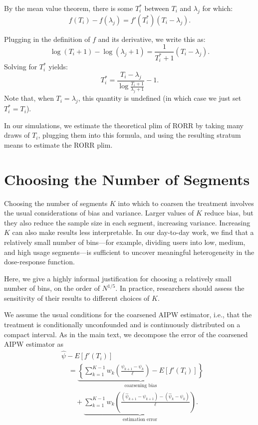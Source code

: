\documentclass[11pt]{article}
\begin{document}
By the mean value theorem, there is some $T_i^*$ between $T_i$ and $\lambda_j$ for which:
\begin{equation}
    f(T_i) - f(\lambda_j) = f'(T_i^*) (T_i - \lambda_j).
\end{equation}

Plugging in the definition of $f$ and its derivative, we write this as:
\begin{equation}
    \log(T_i + 1) - \log(\lambda_j + 1) = \frac{1}{T_i^* + 1} (T_i - \lambda_j).
\end{equation}
Solving for $T_i^*$ yields:
\begin{equation}
    T_i^* = \frac{T_i - \lambda_j}{\log \frac{T_i + 1}{\lambda_j + 1}} - 1.
\end{equation}
Note that, when $T_i = \lambda_j$, this quantity is undefined (in which case we just set $T_i^* = T_i$).

In our simulations, we estimate the theoretical plim of RORR by taking many draws of $T_i$, plugging them into this formula, and using the resulting stratum means to estimate the RORR plim.

\section{Choosing the Number of Segments}

\label{app:guidance}

Choosing the number of segments $K$ into which to coarsen the treatment involves
the usual considerations of bias and variance. Larger values of $K$ reduce bias, but they also reduce the sample size in each segment, increasing variance.  Increasing $K$ can also make results less interpretable.  In our day-to-day work, we find that a relatively small number of bins---for example, dividing users into low, medium, and high usage segments---is sufficient to uncover meaningful heterogeneity in the dose-response function. 

Here, we give a highly informal justification for choosing a relatively small number of bins, on the order of $N^{1/5}$.  In practice, researchers should assess the sensitivity of their results to different choices of $K$.

We assume the usual conditions for the coarsened AIPW estimator, i.e., that the treatment is conditionally unconfounded and is continuously distributed on a compact interval.  As in the main text, we decompose the error of the coarsened AIPW estimator as
\begin{align}
\nonumber 
& \widehat{\psi} - E[f'(T_i)] \\
& \quad =
\underbrace{\left\{
\sum_{k=1}^{K-1}
w_k
\left(
\frac{\psi_{k+1}-\psi_k}{\ell}
\right)
-E[f'(T_i)]
\right\}}_{\text{coarsening bias}} \nonumber
\\
& \qquad +
\underbrace{
\sum_{k=1}^{K-1}
w_k
\left(
\frac{
(\hat\psi_{k+1}-\psi_{k+1})
-
(\hat\psi_k-\psi_k)
}{\ell}
\right)
}_{\text{estimation error}}.
\end{align}
\end{document}
